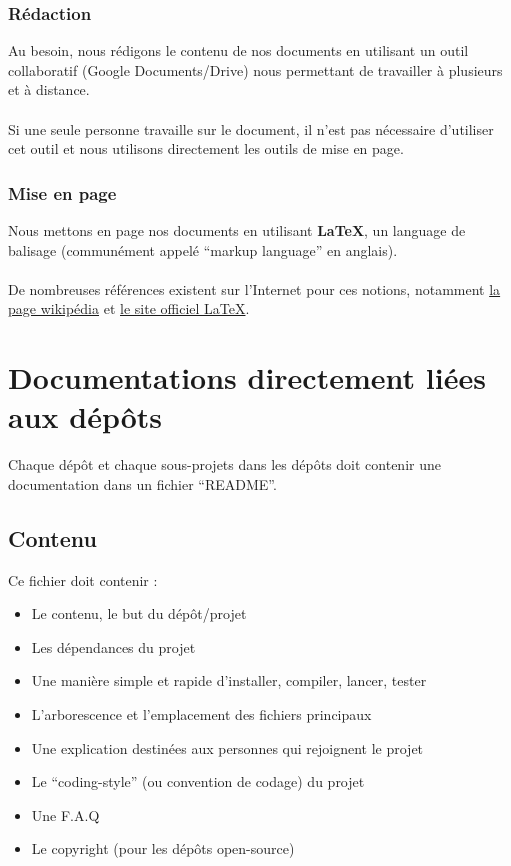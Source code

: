 \documentclass{life-fr}
\begin{document}
\subsubsection{Rédaction}

Au besoin, nous rédigons le contenu de nos documents en utilisant un
outil collaboratif (Google Documents/Drive) nous permettant de
travailler à plusieurs et à distance.\\
\\
Si une seule personne travaille sur le document, il n'est pas
nécessaire d'utiliser cet outil et nous utilisons directement les
outils de mise en page.

\subsubsection{Mise en page}

Nous mettons en page nos documents en utilisant \textbf{LaTeX},
un language de balisage (communément appelé ``markup language'' en anglais).\\
\\
De nombreuses références existent sur l'Internet pour ces notions, notamment
\href{http://fr.wikipedia.org/wiki/Langage_de_balisage}{la page wikipédia} et
\href{http://www.latex-project.org/}{le site officiel LaTeX}.

\section{Documentations directement liées aux dépôts}

Chaque dépôt et chaque sous-projets dans les dépôts doit contenir
une documentation dans un fichier ``README''.

\subsection{Contenu}

Ce fichier doit contenir :
\begin{itemize}
  \item Le contenu, le but du dépôt/projet
  \item Les dépendances du projet
  \item Une manière simple et rapide d'installer, compiler, lancer, tester
  \item L'arborescence et l'emplacement des fichiers principaux
  \item Une explication destinées aux personnes qui rejoignent le projet
  \item Le ``coding-style'' (ou convention de codage) du projet
  \item Une F.A.Q
  \item Le copyright (pour les dépôts open-source)
\end{itemize}
\end{document}
